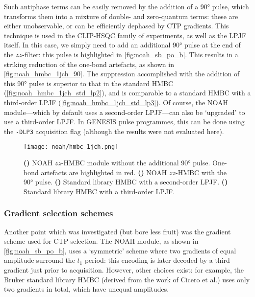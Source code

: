 Such antiphase terms can be easily removed by the addition of a \carbon{} \ang{90} pulse, which transforms them into a mixture of double- and zero-quantum terms: these are either unobservable, or can be efficiently dephased by CTP gradients.
This technique is used in the CLIP-HSQC family of experiments\autocite{Enthart2008JMR,Gyongyosi2021AC}, as well as the LPJF itself.
In this case, we simply need to add an additional \carbon{} \ang{90} pulse at the end of the $zz$-filter: this pulse is highlighted in \cref{fig:noah_sb_po_b}.
This results in a striking reduction of the one-bond artefacts, as shown in \cref{fig:noah_hmbc_1jch_90}.
The suppression accomplished with the addition of this \ang{90} pulse is superior to that in the standard HMBC (\cref{fig:noah_hmbc_1jch_std_lp2}), and is comparable to a standard HMBC with a third-order LPJF (\cref{fig:noah_hmbc_1jch_std_lp3}).
Of course, the NOAH module---which by default uses a second-order LPJF---can also be `upgraded' to use a third-order LPJF.
In GENESIS pulse programmes, this can be done using the \texttt{-DLP3} acquisition flag (although the results were not evaluated here).

\begin{figure}[!ht]
    \centering
    \texttt{[image: noah/hmbc\_1jch.png]}%
    {\label{fig:noah_hmbc_1jch_no90}}%
    {\label{fig:noah_hmbc_1jch_90}}%
    {\label{fig:noah_hmbc_1jch_std_lp2}}%
    {\label{fig:noah_hmbc_1jch_std_lp3}}%
    \caption[Suppression of one-bond artefacts in NOAH HMBC spectra]{
        \textbf{()} NOAH $zz$-HMBC module without the additional \ang{90} pulse.
        One-bond artefacts are highlighted in red.
        \textbf{()} NOAH $zz$-HMBC with the \ang{90} pulse.
        \textbf{()} Standard library HMBC with a second-order LPJF.
        \textbf{()} Standard library HMBC with a third-order LPJF.
    }
    \label{fig:noah_hmbc_1jch}
\end{figure}


\subsubsection{Gradient selection schemes}

Another point which was investigated (but bore less fruit) was the gradient scheme used for CTP selection.
The NOAH module, as shown in \cref{fig:noah_sb_po_b}, uses a `symmetric' scheme where two gradients of equal amplitude surround the $t_1$ period: this encoding is later decoded by a third gradient just prior to acquisition.
However, other choices exist: for example, the Bruker standard library HMBC (derived from the work of Cicero et al.\autocite{Cicero2001JMR}) uses only two gradients in total, which have unequal amplitudes.

